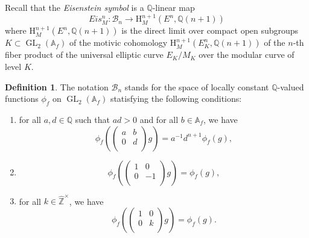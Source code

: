 \documentclass[11pt, a4paper]{amsart}
\theoremstyle{plain}
\theoremstyle{definition}
\newtheorem{definition}[theorem]{Definition}
\numberwithin{equation}{section}
\def\AAA{\mathbb{A}}
\def\QQ{\mathbb{Q}}
\def\ZZ{\mathbb{Z}}
\DeclareMathOperator{\GL}{\mathrm{GL}}
\begin{document}
 Recall that the \textit{Eisenstein symbol} \cite[\S3]{Beilinson_Modular_Curve} is a $\QQ$-linear map 
 \begin{equation*}
     Eis^{n}_{M} \colon \mathcal{B}_{n} \longrightarrow \mathrm{H}_{M}^{n + 1}(E^n, \QQ(n + 1))
 \end{equation*}
where $\mathrm{H}_{M}^{n + 1}(E^n, \QQ(n + 1))$ is the direct limit over compact open subgroups $K \subset \GL_{2}(\AAA_f)$ of the motivic cohomology $\mathrm{H}_{M}^{n + 1}(E^n_K, \QQ(n + 1))$ of the $n$-th fiber product of the universal elliptic curve $E_K / M_K$ over the modular curve of level $K$. 

\begin{definition}
\label{Def: source Eisenstein symbol}
The notation $\mathcal{B}_{n}$ stands for the space of locally constant $\QQ$-valued functions $\phi_f$ on $\GL_2(\AAA_f)$ statisfying the following conditions: 
\begin{enumerate}
    \item for all $a, d \in \QQ$ such that $ad > 0$ and for all $b \in \AAA_f$, we have 
          \begin{equation}
          \label{eqn:Eis_Symbol_(1)}
              \phi_f( \begin{pmatrix}
                        a & b \\
                        0  & d \\
                      \end{pmatrix} g) = a^{-1} d^{n+1} \phi_f(g), 
          \end{equation}
    \item \begin{equation*}
             \phi_f(\begin{pmatrix}
                        1 &  0 \\
                        0   & -1 \\
                    \end{pmatrix}g) = \phi_f(g), 
          \end{equation*}
     \item for all $k \in \hat{\ZZ}^{\times}$, we have 
           \begin{equation*}
               \phi_{f}(\begin{pmatrix}
                            1 & 0\\
                            0  & k\\ 
                        \end{pmatrix}g) = \phi_f(g). 
           \end{equation*}
\end{enumerate}
\end{definition}
\end{document}
